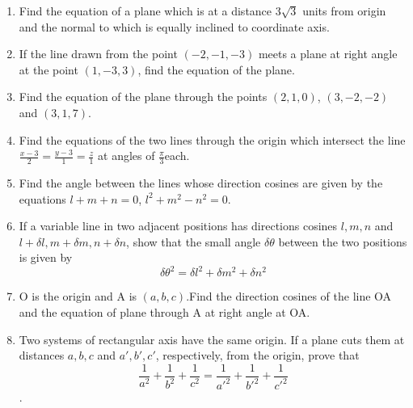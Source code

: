 \documentclass[12pt]{article}
\begin{document}
\begin{enumerate}
\item Find the equation of a plane which is at a distance 3$\sqrt{3}$ units from origin and the normal to which is equally inclined to coordinate axis.
\item If the line drawn from the point $(-2,-1,-3)$ meets a plane at right angle at the point $(1,-3,3)$, find the equation of the plane.
\item Find the equation of the plane through the points $(2,1,0)$, $(3,-2,-2)$ and $(3,1,7)$.
\item Find the equations of the two lines through the origin which intersect the line \(\displaystyle \frac{x-3}{2}=\frac{y-3}{1}=\frac{z}{1}\) at angles of \(\displaystyle \frac{\pi}{3}\)each.
\item Find the angle between the lines whose direction cosines are given by the equations $l+m+n=0$, $l^2+m^2-n^2=0$.
\item If a variable line in two adjacent positions has directions cosines $l, m, n$ and $l+\delta l, m+\delta m, n+\delta n$, show that the small angle $\delta\theta$ between the two positions is given by $$\delta\theta^2=\delta l^2+\delta m^2+\delta n^2$$ 
\item O is the origin and A is $(a,b,c)$.Find the direction cosines of the line OA and the equation of plane through A at right angle at OA.
\item Two systems of rectangular axis have the same origin. If a plane cuts them at distances $a,b,c$ and $a',b',c'$, respectively, from the origin, prove that $$\frac{1}{a^2}+\frac{1}{b^2}+\frac{1}{c^2}=\frac{1}{a'^2}+\frac{1}{b'^2}+\frac{1}{c'^2}$$.

\end{enumerate}
\end{document}
